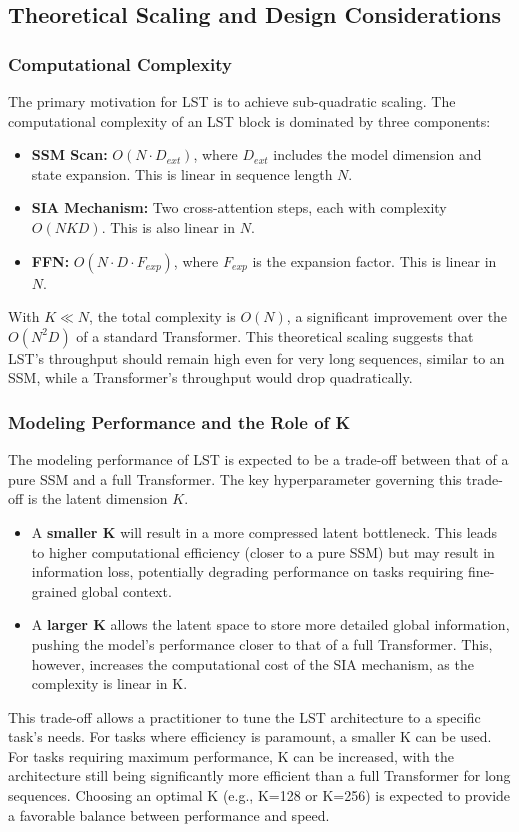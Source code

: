 \documentclass[10pt,twocolumn,letterpaper]{article}
\begin{document}
\subsection{Theoretical Scaling and Design Considerations}

\subsubsection{Computational Complexity}
The primary motivation for LST is to achieve sub-quadratic scaling. The computational complexity of an LST block is dominated by three components:
\begin{itemize}
    \item \textbf{SSM Scan:} \(O(N \cdot D_{ext})\), where \(D_{ext}\) includes the model dimension and state expansion. This is linear in sequence length \(N\).
    \item \textbf{SIA Mechanism:} Two cross-attention steps, each with complexity \(O(NKD)\). This is also linear in \(N\).
    \item \textbf{FFN:} \(O(N \cdot D \cdot F_{exp})\), where \(F_{exp}\) is the expansion factor. This is linear in \(N\).
\end{itemize}
With \(K \ll N\), the total complexity is \(O(N)\), a significant improvement over the \(O(N^2 D)\) of a standard Transformer. This theoretical scaling suggests that LST's throughput should remain high even for very long sequences, similar to an SSM, while a Transformer's throughput would drop quadratically.

\subsubsection{Modeling Performance and the Role of K}
The modeling performance of LST is expected to be a trade-off between that of a pure SSM and a full Transformer. The key hyperparameter governing this trade-off is the latent dimension \(K\).
\begin{itemize}
    \item A \textbf{smaller K} will result in a more compressed latent bottleneck. This leads to higher computational efficiency (closer to a pure SSM) but may result in information loss, potentially degrading performance on tasks requiring fine-grained global context.
    \item A \textbf{larger K} allows the latent space to store more detailed global information, pushing the model's performance closer to that of a full Transformer. This, however, increases the computational cost of the SIA mechanism, as the complexity is linear in K.
\end{itemize}
This trade-off allows a practitioner to tune the LST architecture to a specific task's needs. For tasks where efficiency is paramount, a smaller K can be used. For tasks requiring maximum performance, K can be increased, with the architecture still being significantly more efficient than a full Transformer for long sequences. Choosing an optimal K (e.g., K=128 or K=256) is expected to provide a favorable balance between performance and speed.
\end{document}
